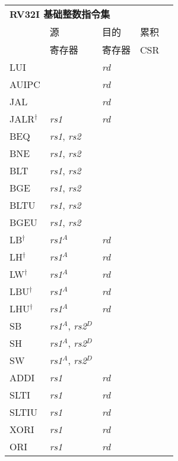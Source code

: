 \begin{tabular}{p{3cm}|p{3cm}|p{2cm}|p{4cm}|p{4cm}}
  \multicolumn{4}{l}{\bf RV32I 基础整数指令集} \\
  \cline{2-4}
   & 源    & 目的 & 累积 \\
   & 寄存器 & 寄存器   & CSR \\
  \cline{2-4}
   LUI &  & {\em rd} &   & \\
   \cline{2-4}
   AUIPC &  & {\em rd} &   & \\
   \cline{2-4}
   JAL &  & {\em rd} &  & \\
   \cline{2-4}
   JALR$^\dagger$ & {\em rs1} & {\em rd} &  & \\
   \cline{2-4}
   BEQ & {\em rs1}, {\em rs2} &  &   & \\
   \cline{2-4}
   BNE & {\em rs1}, {\em rs2} &  &   & \\
   \cline{2-4}
   BLT & {\em rs1}, {\em rs2} &  &   & \\
   \cline{2-4}
   BGE & {\em rs1}, {\em rs2} &  &   & \\
   \cline{2-4}
   BLTU & {\em rs1}, {\em rs2} &  &   & \\
   \cline{2-4}
   BGEU & {\em rs1}, {\em rs2} &  &   & \\
   \cline{2-4}
   LB$^\dagger$ & {\em rs1}$^A$ & {\em rd} &   & \\
   \cline{2-4}
   LH$^\dagger$ & {\em rs1}$^A$ & {\em rd} &   & \\
   \cline{2-4}
   LW$^\dagger$ & {\em rs1}$^A$ & {\em rd} &   & \\
   \cline{2-4}
   LBU$^\dagger$ & {\em rs1}$^A$ & {\em rd} &   & \\
   \cline{2-4}
   LHU$^\dagger$ & {\em rs1}$^A$ & {\em rd} &   & \\
   \cline{2-4}
   SB & {\em rs1}$^A$, {\em rs2}$^D$ &  &   & \\
   \cline{2-4}
   SH & {\em rs1}$^A$, {\em rs2}$^D$ &  &   & \\
   \cline{2-4}
   SW & {\em rs1}$^A$, {\em rs2}$^D$ &  &   & \\
   \cline{2-4}
   ADDI & {\em rs1} & {\em rd} &   & \\
   \cline{2-4}
   SLTI & {\em rs1} & {\em rd} &   & \\
   \cline{2-4}
   SLTIU & {\em rs1} & {\em rd} &   & \\
   \cline{2-4}
   XORI & {\em rs1} & {\em rd} &   & \\
   \cline{2-4}
   ORI & {\em rs1} & {\em rd} &   & \\

\end{tabular}
